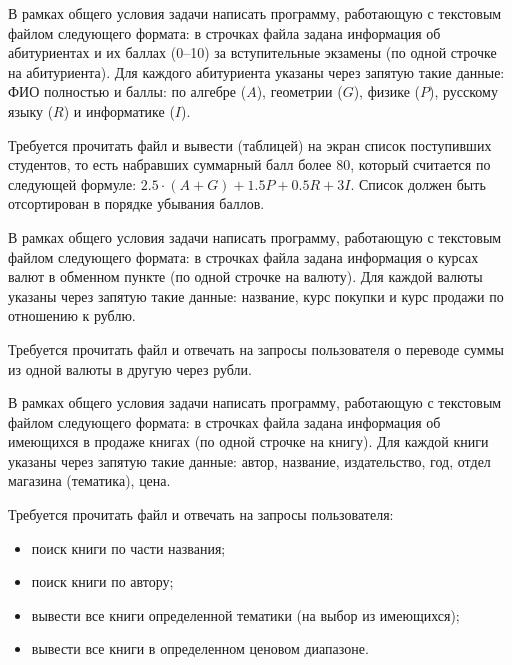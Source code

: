 \begin{zztask}
В рамках общего условия задачи написать программу, работающую с текстовым файлом
следующего формата: в строчках файла задана информация 
об абитуриентах и их баллах (0--10) за вступительные экзамены (по одной строчке на абитуриента).
Для каждого абитуриента указаны через запятую такие данные: ФИО полностью и баллы:
по алгебре ($A$), геометрии ($G$), физике ($P$), русскому языку ($R$) и информатике ($I$).

Требуется прочитать файл и вывести (таблицей) на экран список поступивших студентов, то есть 
набравших суммарный балл более 80, который считается по следующей формуле:
$2.5\cdot(A+G) + 1.5 P + 0.5 R + 3 I$. Список должен быть отсортирован в порядке убывания баллов.
\end{zztask}


\begin{zztask}
В рамках общего условия задачи написать программу, работающую с текстовым файлом
следующего формата: в строчках файла задана информация 
о курсах валют в обменном пункте (по одной строчке на валюту).
Для каждой валюты указаны через запятую такие данные: название, курс покупки и курс продажи
по отношению к рублю.

Требуется прочитать файл и отвечать на запросы пользователя о переводе суммы из одной
валюты в другую через рубли.
\end{zztask}


\begin{zztask}
В рамках общего условия задачи написать программу, работающую с текстовым файлом
следующего формата: в строчках файла задана информация
об имеющихся в продаже книгах (по одной строчке на книгу).
Для каждой книги указаны через запятую такие данные: автор, название, издательство, год,
отдел магазина (тематика), цена.

Требуется прочитать файл и отвечать на запросы пользователя:
%
\begin{itemize}
\item поиск книги по части названия;
\item поиск книги по автору;
\item вывести все книги определенной тематики (на выбор из имеющихся);
\item вывести все книги в определенном ценовом диапазоне.
\end{itemize}
\end{zztask}

